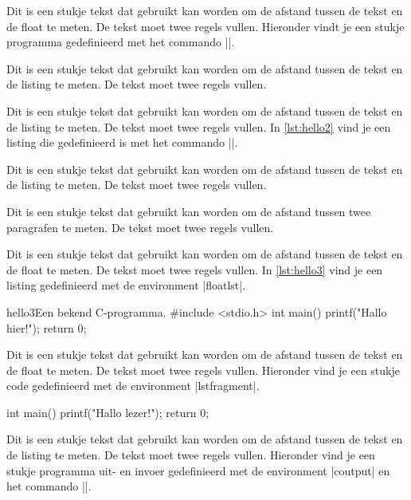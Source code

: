 \begin{llstShortInline}

Dit is een stukje tekst dat gebruikt kan worden om de afstand tussen de tekst en de float te meten. 
De tekst moet twee regels vullen. 
Hieronder vindt je een stukje programma gedefinieerd met het commando |\lstinputfragment|. 


Dit is een stukje tekst dat gebruikt kan worden om de afstand tussen de tekst en de listing te meten. De tekst moet twee regels vullen.

\clearpage
Dit is een stukje tekst dat gebruikt kan worden om de afstand tussen de tekst en de listing te meten. 
De tekst moet twee regels vullen. 
In \cref{lst:hello2} vind je een listing die gedefinieerd is met het commando |\lstinput|.


Dit is een stukje tekst dat gebruikt kan worden om de afstand tussen de tekst en de listing te meten. 
De tekst moet twee regels vullen. 

Dit is een stukje tekst dat gebruikt kan worden om de afstand tussen twee paragrafen te meten. 
De tekst moet twee regels vullen. 

\clearpage
Dit is een stukje tekst dat gebruikt kan worden om de afstand tussen de tekst en de float te meten. De tekst moet twee regels vullen. In \cref{lst:hello3} vind je een listing gedefinieerd met de environment |floatlst|.

\begin{floatlst}[style=cstyle]{hello3}{Een bekend C-programma.}
#include <stdio.h>
int main()
{
	printf("Hallo hier!\n");
	return 0;
}
\end{floatlst}

Dit is een stukje tekst dat gebruikt kan worden om de afstand tussen de tekst en de float te meten. 
De tekst moet twee regels vullen. 
Hieronder vind je een stukje code gedefinieerd met de environment |lstfragment|.

\begin{lstfragment}[style=cstyle]
int main()
{
	printf("Hallo lezer!\n");
	return 0;
}
\end{lstfragment}

Dit is een stukje tekst dat gebruikt kan worden om de afstand tussen de tekst en de listing te meten. De tekst moet twee regels vullen. Hieronder vind je een stukje programma uit- en invoer gedefinieerd met de environment |coutput| en het commando |\cinput|.


\end{llstShortInline}

